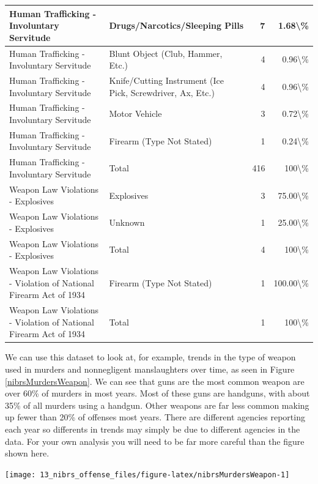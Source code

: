 \documentclass[
]{krantz}
\let\origfigure\figure
\let\endorigfigure\endfigure
\renewenvironment{figure}[1][2] {
    \expandafter\origfigure\expandafter[H]
} {
    \endorigfigure
}
\begin{document}
\begin{longtable}[t]{l|l|r|r}
\hline
Human Trafficking - Involuntary Servitude & Drugs/Narcotics/Sleeping Pills & 7 & 1.68\textbackslash{}\%\\
\hline
Human Trafficking - Involuntary Servitude & Blunt Object (Club, Hammer, Etc.) & 4 & 0.96\textbackslash{}\%\\
\hline
Human Trafficking - Involuntary Servitude & Knife/Cutting Instrument (Ice Pick, Screwdriver, Ax, Etc.) & 4 & 0.96\textbackslash{}\%\\
\hline
Human Trafficking - Involuntary Servitude & Motor Vehicle & 3 & 0.72\textbackslash{}\%\\
\hline
Human Trafficking - Involuntary Servitude & Firearm (Type Not Stated) & 1 & 0.24\textbackslash{}\%\\
\hline
Human Trafficking - Involuntary Servitude & Total & 416 & 100\textbackslash{}\%\\
\hline
Weapon Law Violations - Explosives & Explosives & 3 & 75.00\textbackslash{}\%\\
\hline
Weapon Law Violations - Explosives & Unknown & 1 & 25.00\textbackslash{}\%\\
\hline
Weapon Law Violations - Explosives & Total & 4 & 100\textbackslash{}\%\\
\hline
Weapon Law Violations - Violation of National Firearm Act of 1934 & Firearm (Type Not Stated) & 1 & 100.00\textbackslash{}\%\\
\hline
Weapon Law Violations - Violation of National Firearm Act of 1934 & Total & 1 & 100\textbackslash{}\%\\
\hline
\end{longtable}

We can use this dataset to look at, for example, trends in
the type of weapon used in murders and nonnegligent
manslaughters over time, as seen in Figure
\ref{nibrsMurdersWeapon}. We can see that guns are the most
common weapon are over 60\% of murders in most years. Most
of these guns are handguns, with about 35\% of all murders
using a handgun. Other weapons are far less common making up
fewer than 20\% of offenses most years. There are different
agencies reporting each year so differents in trends may
simply be due to different agencies in the data. For your
own analysis you will need to be far more careful than the
figure shown here.

\begin{figure}

{\centering \texttt{[image: 13\_nibrs\_offense\_files/figure-latex/nibrsMurdersWeapon-1]} 

}

\caption{The annual percent of murders and nonnegligent homicides, by offender weapon, 1991-2022.}\label{fig:nibrsMurdersWeapon}
\end{figure}
\end{document}
